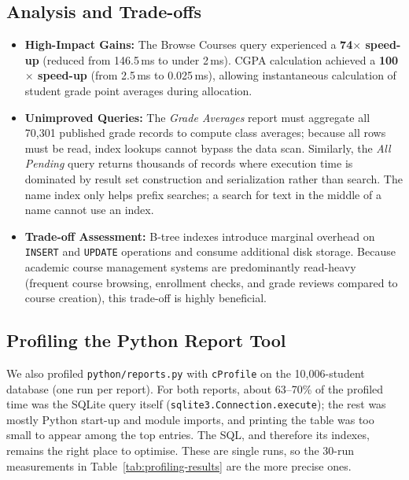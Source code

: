 \subsection{Analysis and Trade-offs}
\begin{itemize}
    \item \textbf{High-Impact Gains:} The Browse Courses query experienced a \textbf{74$\times$ speed-up} (reduced from 146.5\,ms to under 2\,ms). CGPA calculation achieved a \textbf{100$\times$ speed-up} (from 2.5\,ms to 0.025\,ms), allowing instantaneous calculation of student grade point averages during allocation.
    \item \textbf{Unimproved Queries:} The \emph{Grade Averages} report must aggregate all 70{,}301 published grade records to compute class averages; because all rows must be read, index lookups cannot bypass the data scan. Similarly, the \emph{All Pending} query returns thousands of records where execution time is dominated by result set construction and serialization rather than search. The name index only helps prefix searches; a search for text in the middle of a name cannot use an index.
    \item \textbf{Trade-off Assessment:} B-tree indexes introduce marginal overhead on \texttt{INSERT} and \texttt{UPDATE} operations and consume additional disk storage. Because academic course management systems are predominantly read-heavy (frequent course browsing, enrollment checks, and grade reviews compared to course creation), this trade-off is highly beneficial.
\end{itemize}

\subsection{Profiling the Python Report Tool}
We also profiled \texttt{python/reports.py} with \texttt{cProfile} on the 10{,}006-student database
(one run per report). For both reports, about 63--70\% of the profiled time was the SQLite query
itself (\texttt{sqlite3.Connection.execute}); the rest was mostly Python start-up and module imports,
and printing the table was too small to appear among the top entries. The SQL, and therefore its
indexes, remains the right place to optimise. These are single runs, so the 30-run measurements in
Table~\ref{tab:profiling-results} are the more precise ones.
